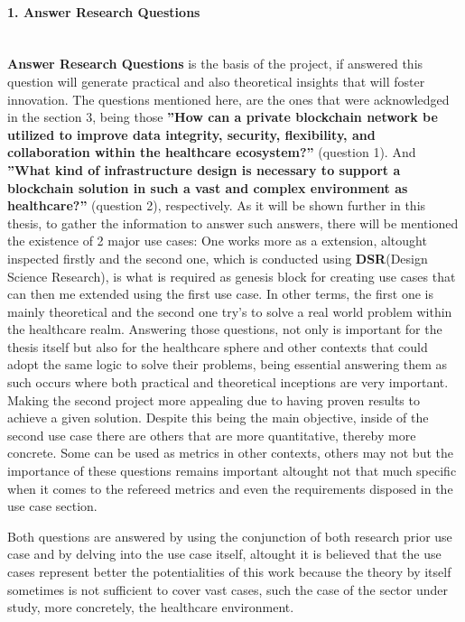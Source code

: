 \paragraph{1. Answer Research Questions}\mbox{}\\
\textbf{Answer Research Questions} is the basis of the project, if answered this question will generate practical and also theoretical insights that will foster innovation. The questions mentioned here, are the ones that were acknowledged in the section 3, being those \textbf{”How can a private blockchain network be utilized to improve data integrity, security,
flexibility, and collaboration within the healthcare ecosystem?”} (question 1). And \textbf{”What kind of infrastructure design is necessary to support a blockchain solution in such a
vast and complex environment as healthcare?”} (question 2), respectively. As it will be shown further in this thesis, to gather the information to answer such answers, there will be mentioned the existence of 2 major use cases: One works more as a extension, altought inspected firstly and the second one, which is conducted using \textbf{DSR}(Design Science Research), is what is required as genesis block for creating use cases that can then me extended using the first use case. In other terms, the first one is mainly theoretical  and the second one try's to solve a real world problem within the healthcare realm. Answering those questions, not only is important for the thesis itself but also for the healthcare sphere and other contexts that could adopt the same logic to solve their problems, being essential answering them as such occurs where both practical and theoretical inceptions are very important. Making the second project more appealing due to having proven results to achieve a given solution.
Despite this being the main objective, inside of the second use case there are others that are more quantitative, thereby more concrete. Some can be used as metrics in other contexts, others may not but the importance of these questions remains important altought not that much specific when it comes to the refereed metrics and even the requirements disposed in the use case section.

Both questions are answered by using the conjunction of both research prior use case and by delving into the use case itself, altought it is believed that the use cases represent better the potentialities of this work because the theory by itself sometimes is not sufficient to cover vast cases, such the case of the sector under study, more concretely, the healthcare environment.


